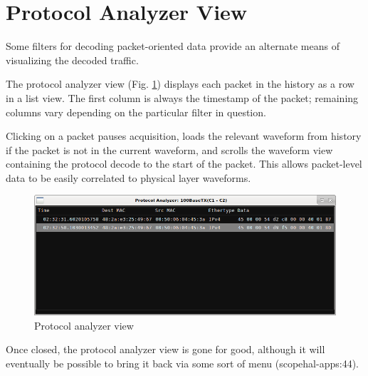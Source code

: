 \section{Protocol Analyzer View}

Some filters for decoding packet-oriented data provide an alternate means of visualizing the decoded traffic.

The protocol analyzer view (Fig. \ref{proto-analyzer}) displays each packet in the history as a row in a list view. The
first column is always the timestamp of the packet; remaining columns vary depending on the particular filter in
question.

Clicking on a packet pauses acquisition, loads the relevant waveform from history if the packet is not in the current
waveform, and scrolls the waveform view containing the protocol decode to the start of the packet. This allows
packet-level data to be easily correlated to physical layer waveforms.

\begin{figure}[H]
\centering
\includegraphics[width=14cm]{images/proto-analyzer.png}
\caption{Protocol analyzer view}
\label{proto-analyzer}
\end{figure}

Once closed, the protocol analyzer view is gone for good, although it will eventually be possible to bring it back via
some sort of menu (scopehal-apps:44).
